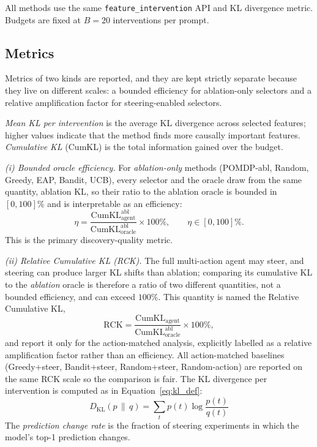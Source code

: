 All methods use the same \texttt{feature\_intervention} API and
KL divergence metric.  Budgets are fixed at $B=20$ interventions
per prompt.

\subsection{Metrics}

Metrics of two kinds are reported, and they are kept
strictly separate because they live on different scales: a bounded efficiency for
ablation-only selectors and a relative amplification factor for steering-enabled
selectors.

\emph{Mean KL per intervention} is the average KL divergence across selected
features; higher values indicate that the method finds more causally important
features. \emph{Cumulative KL} (CumKL) is the total information gained over the
budget.

\emph{(i) Bounded oracle efficiency.} For \emph{ablation-only} methods (POMDP-abl,
Random, Greedy, EAP, Bandit, UCB), every selector and the oracle draw from the same
quantity, ablation KL, so their ratio to the ablation oracle is bounded in
$[0,100]\%$ and is interpretable as an efficiency:
\begin{equation}
  \label{eq:oracle_eff}
  \eta = \frac{\text{CumKL}^{\text{abl}}_{\text{agent}}}
              {\text{CumKL}^{\text{abl}}_{\text{oracle}}} \times 100\%,
  \qquad \eta \in [0,100]\%.
\end{equation}
This is the primary discovery-quality metric.

\emph{(ii) Relative Cumulative KL (RCK).} The full multi-action agent may steer,
and steering can produce larger KL shifts than ablation; comparing its cumulative
KL to the \emph{ablation} oracle is therefore a ratio of two different quantities,
not a bounded efficiency, and can exceed $100\%$. This quantity is named the
Relative Cumulative KL,
\begin{equation}
  \label{eq:rck}
  \text{RCK} = \frac{\text{CumKL}_{\text{agent}}}
                    {\text{CumKL}^{\text{abl}}_{\text{oracle}}} \times 100\%,
\end{equation}
and report it only for the action-matched analysis, explicitly labelled as a
relative amplification factor rather than an efficiency. All action-matched
baselines (Greedy+steer, Bandit+steer, Random+steer, Random-action) are reported on
the same RCK scale so the comparison is fair.
The KL divergence per intervention is computed as in Equation~\ref{eq:kl_def}:
\begin{equation}
  \label{eq:kl_def}
  D_\mathrm{KL}(p \,\|\, q) = \sum_t p(t)\log\frac{p(t)}{q(t)}
\end{equation}
The \emph{prediction change rate} is the fraction of steering experiments
in which the model's top-1 prediction changes.

